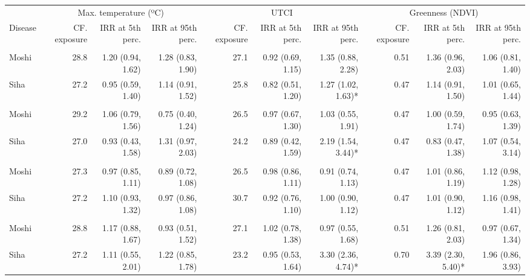 \begin{table}[t]
\fontsize{12.0pt}{14.4pt}\selectfont
\begin{tabular*}{\linewidth}{@{\extracolsep{\fill}}l|rrrrrrrrr}
\toprule
 & \multicolumn{3}{c}{Max. temperature (ºC)} & \multicolumn{3}{c}{UTCI} & \multicolumn{3}{c}{Greenness (NDVI)} \\ 
\cmidrule(lr){2-4} \cmidrule(lr){5-7} \cmidrule(lr){8-10}
Disease & CF. exposure & IRR at 5th perc. & IRR at 95th perc. & CF. exposure & IRR at 5th perc. & IRR at 95th perc. & CF. exposure & IRR at 5th perc. & IRR at 95th perc. \\ 
\midrule\addlinespace[2.5pt]
\multicolumn{10}{l}{Pneumonia, Severe} \\[2.5pt] 
\midrule\addlinespace[2.5pt]
Moshi & 28.8 & 1.20 (0.94, 1.62)  & 1.28 (0.83, 1.90)  & 27.1 & 0.92 (0.69, 1.15)  & 1.35 (0.88, 2.28)  & 0.51 & 1.36 (0.96, 2.03)  & 1.06 (0.81, 1.40)  \\ 
Siha & 27.2 & 0.95 (0.59, 1.40)  & 1.14 (0.91, 1.52)  & 25.8 & 0.82 (0.51, 1.20)  & 1.27 (1.02, 1.63)* & 0.47 & 1.14 (0.91, 1.50)  & 1.01 (0.65, 1.44)  \\ 
\midrule\addlinespace[2.5pt]
\multicolumn{10}{l}{Tuberculosis} \\[2.5pt] 
\midrule\addlinespace[2.5pt]
Moshi & 29.2 & 1.06 (0.79, 1.56)  & 0.75 (0.40, 1.24)  & 26.5 & 0.97 (0.67, 1.30)  & 1.03 (0.55, 1.91)  & 0.47 & 1.00 (0.59, 1.74)  & 0.95 (0.63, 1.39)  \\ 
Siha & 27.0 & 0.93 (0.43, 1.58)  & 1.31 (0.97, 2.03)  & 24.2 & 0.89 (0.42, 1.59)  & 2.19 (1.54, 3.44)* & 0.47 & 0.83 (0.47, 1.38)  & 1.07 (0.54, 3.14)  \\ 
\midrule\addlinespace[2.5pt]
\multicolumn{10}{l}{Skin Infection - Fungal} \\[2.5pt] 
\midrule\addlinespace[2.5pt]
Moshi & 27.3 & 0.97 (0.85, 1.11)  & 0.89 (0.72, 1.08)  & 26.5 & 0.98 (0.86, 1.11)  & 0.91 (0.74, 1.13)  & 0.47 & 1.01 (0.86, 1.19)  & 1.12 (0.98, 1.28)  \\ 
Siha & 27.2 & 1.10 (0.93, 1.32)  & 0.97 (0.86, 1.08)  & 30.7 & 0.92 (0.76, 1.10)  & 1.00 (0.90, 1.12)  & 0.47 & 1.01 (0.90, 1.12)  & 1.16 (0.98, 1.41)  \\ 
\midrule\addlinespace[2.5pt]
\multicolumn{10}{l}{Malnutrition} \\[2.5pt] 
\midrule\addlinespace[2.5pt]
Moshi & 28.8 & 1.17 (0.88, 1.67)  & 0.93 (0.51, 1.52)  & 27.1 & 1.02 (0.78, 1.38)  & 0.97 (0.55, 1.68)  & 0.51 & 1.26 (0.81, 2.03)  & 0.97 (0.67, 1.34)  \\ 
Siha & 27.2 & 1.11 (0.55, 2.01)  & 1.22 (0.85, 1.78)  & 23.2 & 0.95 (0.53, 1.64)  & 3.30 (2.36, 4.74)* & 0.70 & 3.39 (2.30, 5.40)* & 1.96 (0.86, 3.93)  \\ 

\end{tabular*}
\end{table}
